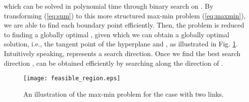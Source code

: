 \documentclass[10pt,journal,letterpaper,compsoc]{IEEEtran}
\begin{document}
which can be solved in polynomial time through binary search on  \cite{boyd:2004}. By transforming (\ref{eq:sum}) to this more structured max-min problem (\ref{eq:maxmin}), we are able to find each boundary point efficiently. Then, the problem is reduced to finding a globally optimal , given which we can obtain a globally optimal solution, i.e., the tangent point of the hyperplane and , as illustrated in Fig. \ref{fig:fr}. Intuitively speaking,  represents a search direction. Once we find the best search direction ,  can be obtained efficiently by searching along the direction of .

\begin{figure}[t]
\begin{center}
\vspace{0.5cm}\hspace{-0cm} {\texttt{[image: feasible\_region.eps]}}\hspace{-0.0cm}
\vspace{5.5cm} \caption{An illustration of the max-min problem for the case with two links.}\vspace{-0.0cm}
\label{fig:fr}
\end{center}
\end{figure}
\end{document}
